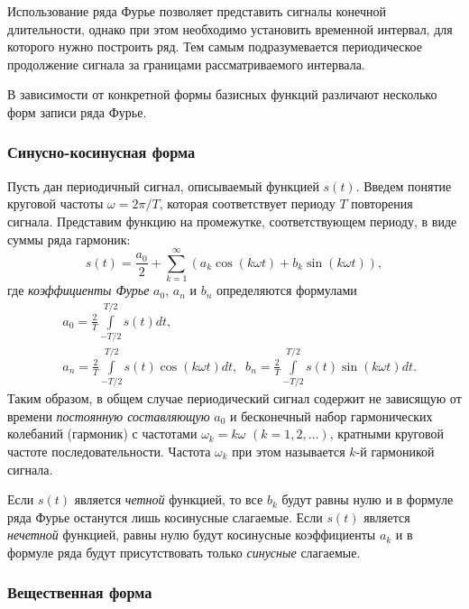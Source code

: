 \documentclass[12pt,a4paper]{article}
\begin{document}
Использование ряда Фурье позволяет представить сигналы конечной длительности, однако при этом необходимо установить временной интервал, для которого нужно построить ряд. Тем самым подразумевается периодическое продолжение сигнала за границами рассматриваемого интервала.

В зависимости от конкретной формы базисных функций различают несколько форм записи ряда Фурье.

\subsubsection{Синусно-косинусная форма}

Пусть дан периодичный сигнал, описываемый функцией $s\left(t\right)$. Введем понятие круговой частоты $\omega =2\pi /T$, которая соответствует периоду $T$ повторения сигнала. Представим функцию на промежутке, соответствующем периоду, в виде суммы ряда гармоник:
\begin{equation}
\label{eq:fourier_series_harm}
s\left( t\right) = \frac{a_0}{2} + \sum\limits_{k = 1}^\infty {\left( {{a_k}\cos\left( k\omega t\right) + {b_k}\sin\left(k\omega t\right)} \right)} ,
\end{equation}
где \emph{коэффициенты Фурье} $a_0$, $a_n$ и $b_n$ определяются формулами
\begin{eqnarray}
&a_0 = \frac{2}{T}\int\limits_{-T/2}^{T/2} {s\left( t \right)dt} , \nonumber\\
&{a_n = \frac{2}{T}\int\limits_{-T/2}^{T/2} {s\left( t \right)\cos \left( k\omega t \right) dt} ,}\;\;
{b_n = \frac{2}{T}\int\limits_{-T/2}^{T/2} {s\left( t \right)\sin \left( k\omega t \right) dt} .}
\end{eqnarray} 
Таким образом, в общем случае периодический сигнал содержит не зависящую от времени \emph{постоянную составляющую} $a_0$ и бесконечный набор гармонических колебаний (гармоник) с частотами $\omega_k = k\omega$ $(k=1,2,\ldots )$, кратными круговой частоте последовательности. Частота $\omega_k$ при этом называется $k$-й гармоникой сигнала.

Если $s\left( t\right)$ является \emph{четной} функцией, то все $b_k$ будут равны нулю и в формуле ряда Фурье останутся лишь косинусные слагаемые. Если $s\left( t\right)$ является \emph{нечетной} функцией, равны нулю будут косинусные коэффициенты $a_k$ и в формуле ряда будут присутствовать только \emph{синусные} слагаемые.

\subsubsection{Вещественная форма}
\end{document}
